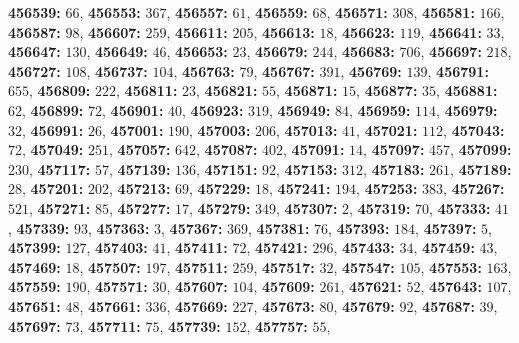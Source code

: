 \textsf{\bfseries 456539:} $66$, \textsf{\bfseries 456553:} $367$, \textsf{\bfseries 456557:} $61$, \textsf{\bfseries 456559:} $68$, \textsf{\bfseries 456571:} $308$, \textsf{\bfseries 456581:} $166$, \textsf{\bfseries 456587:} $98$, \textsf{\bfseries 456607:} $259$, \textsf{\bfseries 456611:} $205$, \textsf{\bfseries 456613:} $18$, \textsf{\bfseries 456623:} $119$, \textsf{\bfseries 456641:} $33$, \textsf{\bfseries 456647:} $130$, \textsf{\bfseries 456649:} $46$, \textsf{\bfseries 456653:} $23$, \textsf{\bfseries 456679:} $244$, \textsf{\bfseries 456683:} $706$, \textsf{\bfseries 456697:} $218$, \textsf{\bfseries 456727:} $108$, \textsf{\bfseries 456737:} $104$, \textsf{\bfseries 456763:} $79$, \textsf{\bfseries 456767:} $391$, \textsf{\bfseries 456769:} $139$, \textsf{\bfseries 456791:} $655$, \textsf{\bfseries 456809:} $222$, \textsf{\bfseries 456811:} $23$, \textsf{\bfseries 456821:} $55$, \textsf{\bfseries 456871:} $15$, \textsf{\bfseries 456877:} $35$, \textsf{\bfseries 456881:} $62$, \textsf{\bfseries 456899:} $72$, \textsf{\bfseries 456901:} $40$, \textsf{\bfseries 456923:} $319$, \textsf{\bfseries 456949:} $84$, \textsf{\bfseries 456959:} $114$, \textsf{\bfseries 456979:} $32$, \textsf{\bfseries 456991:} $26$, \textsf{\bfseries 457001:} $190$, \textsf{\bfseries 457003:} $206$, \textsf{\bfseries 457013:} $41$, \textsf{\bfseries 457021:} $112$, \textsf{\bfseries 457043:} $72$, \textsf{\bfseries 457049:} $251$, \textsf{\bfseries 457057:} $642$, \textsf{\bfseries 457087:} $402$, \textsf{\bfseries 457091:} $14$, \textsf{\bfseries 457097:} $457$, \textsf{\bfseries 457099:} $230$, \textsf{\bfseries 457117:} $57$, \textsf{\bfseries 457139:} $136$, \textsf{\bfseries 457151:} $92$, \textsf{\bfseries 457153:} $312$, \textsf{\bfseries 457183:} $261$, \textsf{\bfseries 457189:} $28$, \textsf{\bfseries 457201:} $202$, \textsf{\bfseries 457213:} $69$, \textsf{\bfseries 457229:} $18$, \textsf{\bfseries 457241:} $194$, \textsf{\bfseries 457253:} $383$, \textsf{\bfseries 457267:} $521$, \textsf{\bfseries 457271:} $85$, \textsf{\bfseries 457277:} $17$, \textsf{\bfseries 457279:} $349$, \textsf{\bfseries 457307:} $2$, \textsf{\bfseries 457319:} $70$, \textsf{\bfseries 457333:} $41$, \textsf{\bfseries 457339:} $93$, \textsf{\bfseries 457363:} $3$, \textsf{\bfseries 457367:} $369$, \textsf{\bfseries 457381:} $76$, \textsf{\bfseries 457393:} $184$, \textsf{\bfseries 457397:} $5$, \textsf{\bfseries 457399:} $127$, \textsf{\bfseries 457403:} $41$, \textsf{\bfseries 457411:} $72$, \textsf{\bfseries 457421:} $296$, \textsf{\bfseries 457433:} $34$, \textsf{\bfseries 457459:} $43$, \textsf{\bfseries 457469:} $18$, \textsf{\bfseries 457507:} $197$, \textsf{\bfseries 457511:} $259$, \textsf{\bfseries 457517:} $32$, \textsf{\bfseries 457547:} $105$, \textsf{\bfseries 457553:} $163$, \textsf{\bfseries 457559:} $190$, \textsf{\bfseries 457571:} $30$, \textsf{\bfseries 457607:} $104$, \textsf{\bfseries 457609:} $261$, \textsf{\bfseries 457621:} $52$, \textsf{\bfseries 457643:} $107$, \textsf{\bfseries 457651:} $48$, \textsf{\bfseries 457661:} $336$, \textsf{\bfseries 457669:} $227$, \textsf{\bfseries 457673:} $80$, \textsf{\bfseries 457679:} $92$, \textsf{\bfseries 457687:} $39$, \textsf{\bfseries 457697:} $73$, \textsf{\bfseries 457711:} $75$, \textsf{\bfseries 457739:} $152$, \textsf{\bfseries 457757:} $55$, 
